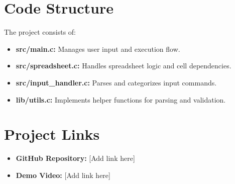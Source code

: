 \documentclass{article}
\begin{document}
\section{Code Structure}
The project consists of:
\begin{itemize}
    \item \textbf{src/main.c:} Manages user input and execution flow.
    \item \textbf{src/spreadsheet.c:} Handles spreadsheet logic and cell dependencies.
    \item \textbf{src/input\_handler.c:} Parses and categorizes input commands.
    \item \textbf{lib/utils.c:} Implements helper functions for parsing and validation.
\end{itemize}

\section{Project Links}
\begin{itemize}
    \item \textbf{GitHub Repository:} [Add link here]
    \item \textbf{Demo Video:} [Add link here]
\end{itemize}
\end{document}
